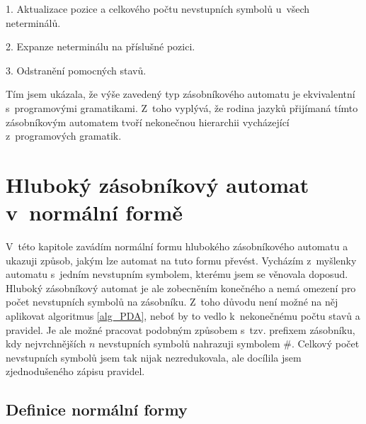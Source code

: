 \begin{list}{}{\setlength\parsep{0cm} \setlength\itemsep{0cm} \setlength\leftmargin{1em}}
\item 1. Aktualizace pozice a celkového počtu nevstupních symbolů u~všech neterminálů.
\item 2. Expanze neterminálu na příslušné pozici.
\item 3. Odstranění pomocných stavů.
\end{list}

Tím jsem ukázala, že výše zavedený typ zásobníkového automatu je ekvivalentní s~programovými gramatikami. Z~toho vyplývá, že rodina jazyků přijímaná tímto zásobníkovým automatem tvoří nekonečnou hierarchii vycházející z~programových gramatik.

\chapter{Hluboký zásobníkový automat v~normální formě}

V~této kapitole zavádím normální formu hlubokého zásobníkového automatu a ukazuji způsob, jakým lze automat na tuto formu převést. Vycházím z~myšlenky automatu s~jedním nevstupním symbolem, kterému jsem se věnovala doposud. Hluboký zásobníkový automat je ale zobecněním konečného a nemá omezení pro počet nevstupních symbolů na zásobníku. Z~toho důvodu není možné na něj aplikovat algoritmus \ref{alg_PDA}, neboť by to vedlo k~nekonečnému počtu stavů a pravidel. Je ale možné pracovat podobným způsobem s~tzv. prefixem zásobníku, kdy nejvrchnějších $n$ nevstupních symbolů nahrazuji symbolem $\#$. Celkový počet nevstupních symbolů jsem tak nijak nezredukovala, ale docílila jsem zjednodušeného zápisu pravidel.


\section{Definice normální formy}

